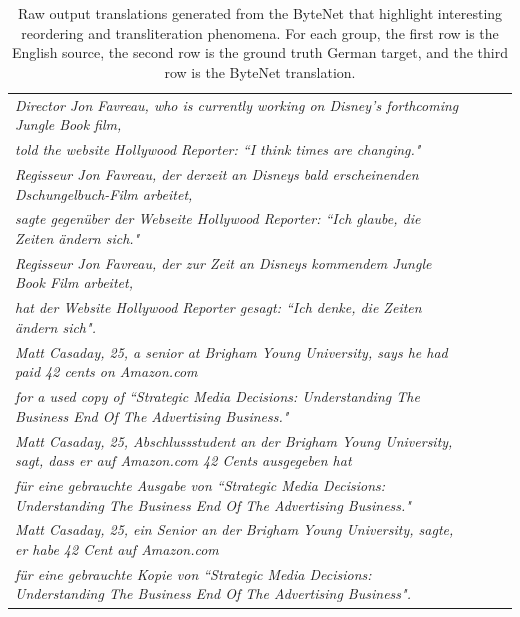 \documentclass{article}
\begin{document}
\begin{table}[t]
\small
  \begin{center}
  \begin{tabular}{lccc}
    \toprule
    \textit{Director Jon Favreau, who is currently working on Disney's forthcoming Jungle Book film,} \\ \textit{told the website Hollywood Reporter: ``I think times are changing."}  \vspace{0.2cm} \\ 
    \textit{Regisseur Jon Favreau, der derzeit an Disneys bald erscheinenden Dschungelbuch-Film arbeitet,} \\ \textit{sagte gegenüber der Webseite Hollywood Reporter: ``Ich glaube, die Zeiten \"andern sich."}  \vspace{0.2cm} \\ 
    \textit{Regisseur Jon Favreau, der zur Zeit an Disneys kommendem Jungle Book Film arbeitet,} \\ \textit{ hat der Website Hollywood Reporter gesagt: ``Ich denke, die Zeiten \"andern sich".}  \\
    \midrule
    \textit{Matt Casaday, 25, a senior at Brigham Young University, says he had paid 42 cents on Amazon.com} \\ \textit{for a used copy of ``Strategic Media Decisions: Understanding The Business End Of The Advertising Business."} \vspace{0.2cm} \\
    \textit{Matt Casaday, 25, Abschlussstudent an der Brigham Young University, sagt, dass er auf Amazon.com 42 Cents ausgegeben hat} \\ \textit{f\"ur eine gebrauchte Ausgabe von ``Strategic Media Decisions: Understanding The Business End Of The Advertising Business."} \vspace{0.2cm}
    \\
    \textit{Matt Casaday, 25, ein Senior an der Brigham Young University, sagte, er habe 42 Cent auf Amazon.com} \\ \textit{f\"ur eine gebrauchte Kopie von ``Strategic Media Decisions: Understanding The Business End Of The Advertising Business".}  \\ 
      \bottomrule
  \end{tabular}
  \end{center}
\caption{Raw output translations generated from the ByteNet that highlight interesting reordering and transliteration phenomena. For each group, the first row is the English source, the second row is the ground truth German target, and the third row is the ByteNet translation.}
\label{tab:samples}
\end{table}
\end{document}

